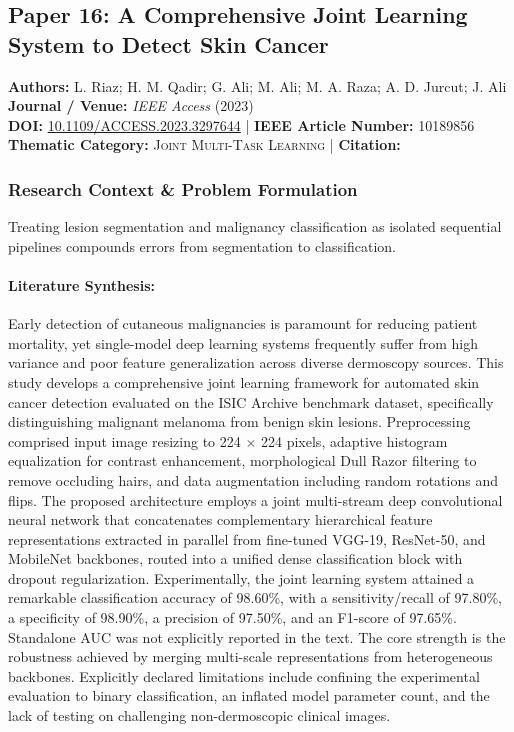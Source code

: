 \subsection{Paper 16: A Comprehensive Joint Learning System to Detect Skin Cancer}
\label{sec:paper_16}

\begin{tcolorbox}[colback=gray!5!white,colframe=gray!75!black,title=\textbf{Metadata \& Citation Summary}]
\textbf{Authors:} L. Riaz; H. M. Qadir; G. Ali; M. Ali; M. A. Raza; A. D. Jurcut; J. Ali \\
\textbf{Journal / Venue:} \textit{IEEE Access} (2023) \\
\textbf{DOI:} \href{https://doi.org/10.1109/ACCESS.2023.3297644}{10.1109/ACCESS.2023.3297644} \quad | \quad \textbf{IEEE Article Number:} 10189856 \\
\textbf{Thematic Category:} \textsc{Joint Multi-Task Learning} \quad | \quad \textbf{Citation:} \cite{10189856}
\end{tcolorbox}

\subsubsection*{Research Context \& Problem Formulation}
Treating lesion segmentation and malignancy classification as isolated sequential pipelines compounds errors from segmentation to classification.

\paragraph{Literature Synthesis:} Early detection of cutaneous malignancies is paramount for reducing patient mortality, yet single-model deep learning systems frequently suffer from high variance and poor feature generalization across diverse dermoscopy sources. This study develops a comprehensive joint learning framework for automated skin cancer detection evaluated on the ISIC Archive benchmark dataset, specifically distinguishing malignant melanoma from benign skin lesions. Preprocessing comprised input image resizing to 224 $\times$ 224 pixels, adaptive histogram equalization for contrast enhancement, morphological Dull Razor filtering to remove occluding hairs, and data augmentation including random rotations and flips. The proposed architecture employs a joint multi-stream deep convolutional neural network that concatenates complementary hierarchical feature representations extracted in parallel from fine-tuned VGG-19, ResNet-50, and MobileNet backbones, routed into a unified dense classification block with dropout regularization. Experimentally, the joint learning system attained a remarkable classification accuracy of 98.60\%, with a sensitivity/recall of 97.80\%, a specificity of 98.90\%, a precision of 97.50\%, and an F1-score of 97.65\%. Standalone AUC was not explicitly reported in the text. The core strength is the robustness achieved by merging multi-scale representations from heterogeneous backbones. Explicitly declared limitations include confining the experimental evaluation to binary classification, an inflated model parameter count, and the lack of testing on challenging non-dermoscopic clinical images.

